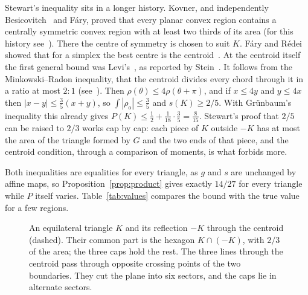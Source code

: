 \documentclass[11pt]{article}
\theoremstyle{remark}
\newcommand{\ro}{\rho_{\mathrm o}}
\newcommand{\abs}[1]{\left|#1\right|}
\begin{document}
Stewart's inequality sits in a longer history. Kovner, and independently Besicovitch~\cite{Bes48} and
Fáry, proved that every planar convex region contains a centrally symmetric convex region with at least
two thirds of its area (for this history see~\cite{Fel26}). There the centre of symmetry is chosen to
suit $K$. Fáry and Rédei showed that for a simplex the best centre is the centroid~\cite[Satz~5]{FR50}.
At the centroid itself the first general bound was Levi's~\cite{Lev52}, as reported by
Stein~\cite[Theorem~3]{Ste56}. It follows from the Minkowski--Radon inequality, that the centroid divides
every chord through it in a ratio at most $2:1$ (see~\cite[Section~2]{Fel26}). Then
$\rho(\theta)\le4\rho(\theta+\pi)$, and if $x\le 4y$ and $y\le 4x$ then $\abs{x-y}\le\tfrac35(x+y)$, so
$\int\abs{\ro}\le\tfrac35$ and $s(K)\ge 2/5$. With Gr\"unbaum's inequality this already gives
$P(K)\le\tfrac12+\tfrac1{18}\cdot\tfrac35=\tfrac8{15}$. Stewart's proof that $2/5$ can be raised to $2/3$
works cap by cap: each piece of $K$ outside $-K$ has at most the area of the triangle formed by $G$ and
the two ends of that piece, and the centroid condition, through a comparison of moments, is what
forbids more.

Both inequalities are equalities for every triangle, as $g$ and $s$ are unchanged by affine maps, so
Proposition~\ref{prop:product} gives exactly $14/27$ for every triangle while $P$ itself varies.
Table~\ref{tab:values} compares the bound with the true value for a few regions.

\begin{figure}[ht]
\centering

\caption{An equilateral triangle $K$ and its reflection $-K$ through the centroid (dashed). Their
common part is the hexagon $K\cap(-K)$, with $2/3$ of the area; the three caps hold the rest. The three
lines through the centroid pass through opposite crossing points of the two boundaries. They cut the
plane into six sectors, and the caps lie in alternate sectors.}
\label{fig:hexagon}
\end{figure}
\end{document}
